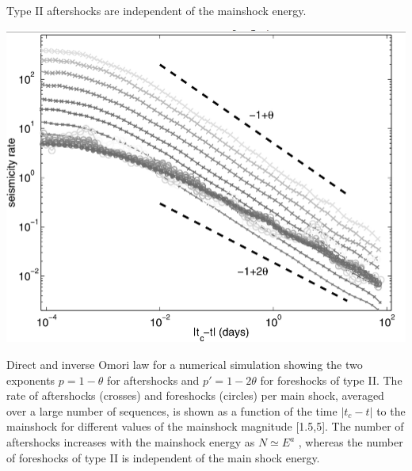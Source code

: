 \documentclass[aspectratio=43,9pt]{beamer}
\begin{document}
\begin{frame}
 {Type II aftershocks are independent of the mainshock energy.}
 
 \begin{center}
   \vspace{-20pt}
   \includegraphics[width=0.6\linewidth]{Figs/fig3} \\
\end{center}
 \vspace{-10pt}Direct and inverse Omori law for a numerical simulation showing the two 
 exponents $p = 1 -\theta$ for aftershocks and $p'=  1 - 2\theta$ for foreshocks
 of type II. 
 The rate of aftershocks (crosses) and foreshocks (circles) per main shock, averaged 
 over a large number of sequences, is shown as a function of the time $|t_c - t|$ 
 to the mainshock for different values of the mainshock magnitude [1.5,5].
 The number of aftershocks increases with the mainshock energy as $N \simeq E^a$ , whereas the
 number of foreshocks of type II is independent of the main shock energy.

 
\end{frame}
\end{document}
